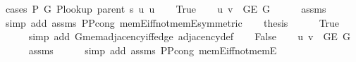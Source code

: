 \begin{isabellebody}
\isanewline
%
\endisadeliminvisible
%
\isadelimproof
%
\endisadelimproof
%
\isatagproof
{}\isamarkupfalse%
\ {\isacharparenleft}{\kern0pt}cases\ {\isachardoublequoteopen}P{\isacharprime}{\kern0pt}\ G{}\ {\isacharparenleft}{\kern0pt}P{\isacharunderscore}{\kern0pt}lookup\ {\isacharparenleft}{\kern0pt}parent\ s{\isacharparenright}{\kern0pt}\ u{\isacharparenright}{\kern0pt}\ u{\isachardoublequoteclose}{\isacharparenright}{\kern0pt}\isanewline
\ \ \isamarkupfalse%
\ True\isanewline
\ \ \isamarkupfalse%
\ {\isachardoublequoteopen}{\isacharbraceleft}{\kern0pt}u{\isacharcomma}{\kern0pt}\ v{\isacharbraceright}{\kern0pt}\ {\isasymin}\ G{\isachardot}{\kern0pt}E\ G{}{\isachardoublequoteclose}\isanewline
\ \ \ \ \isamarkupfalse%
\ assms{\isacharparenleft}{\kern0pt}{}{\isacharparenright}{\kern0pt}\isanewline
\ \ \ \ \isamarkupfalse%
\ {\isacharparenleft}{\kern0pt}simp\ add{\isacharcolon}{\kern0pt}\ assms{\isacharparenleft}{\kern0pt}{}{\isacharparenright}{\kern0pt}\ P{\isacharunderscore}{\kern0pt}P{\isacharprime}{\kern0pt}{\isacharprime}{\kern0pt}{\isacharunderscore}{\kern0pt}cong\ mem{\isacharunderscore}{\kern0pt}E{}{\isacharunderscore}{\kern0pt}iff{\isacharunderscore}{\kern0pt}not{\isacharunderscore}{\kern0pt}mem{\isacharunderscore}{\kern0pt}E{}{\isacharbrackleft}{\kern0pt}symmetric{\isacharbrackright}{\kern0pt}{\isacharparenright}{\kern0pt}\isanewline
\ \ \isamarkupfalse%
\ {\isacharquery}{\kern0pt}thesis\isanewline
\ \ \ \ \isamarkupfalse%
\ True\isanewline
\ \ \ \ \isamarkupfalse%
\ {\isacharparenleft}{\kern0pt}simp\ add{\isacharcolon}{\kern0pt}\ G{}{\isachardot}{\kern0pt}mem{\isacharunderscore}{\kern0pt}adjacency{\isacharunderscore}{\kern0pt}iff{\isacharunderscore}{\kern0pt}edge\ adjacency{\isacharunderscore}{\kern0pt}def{\isacharparenright}{\kern0pt}\isanewline
{}\isamarkupfalse%
\isanewline
\ \ \isamarkupfalse%
\ False\isanewline
\ \ \isamarkupfalse%
\ {\isachardoublequoteopen}{\isacharbraceleft}{\kern0pt}u{\isacharcomma}{\kern0pt}\ v{\isacharbraceright}{\kern0pt}\ {\isasymin}\ G{\isachardot}{\kern0pt}E\ G{}{\isachardoublequoteclose}\isanewline
\ \ \ \ \isamarkupfalse%
\ assms{\isacharparenleft}{\kern0pt}{}{\isacharparenright}{\kern0pt}\isanewline
\ \ \ \ \isamarkupfalse%
\ {\isacharparenleft}{\kern0pt}simp\ add{\isacharcolon}{\kern0pt}\ assms{\isacharparenleft}{\kern0pt}{}{\isacharparenright}{\kern0pt}\ P{\isacharunderscore}{\kern0pt}P{\isacharprime}{\kern0pt}{\isacharprime}{\kern0pt}{\isacharunderscore}{\kern0pt}cong\ mem{\isacharunderscore}{\kern0pt}E{}{\isacharunderscore}{\kern0pt}iff{\isacharunderscore}{\kern0pt}not{\isacharunderscore}{\kern0pt}mem{\isacharunderscore}{\kern0pt}E{}{\isacharparenright}{\kern0pt}\isanewline

\end{isabellebody}
